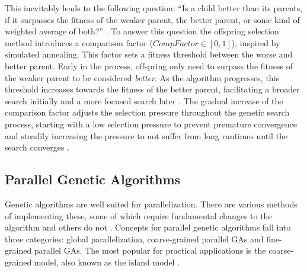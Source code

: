 \documentclass[sigconf]{acmart}
\begin{document}
This inevitably leads to the following question:
\enquote{Is a child better than its parents, if it surpasses the fitness of the
weaker parent, the better parent, or some kind of weighted average of both?}
\cite{Affenzeller2009}.
To answer this question the offspring selection method introduces a comparison
factor ($CompFactor \in [0, 1]$), inspired by simulated annealing. This factor
sets a fitness threshold between the worse and better parent. Early in the
process, offspring only need to surpass the fitness of the weaker parent to
be considered \textit{better}. As the algorithm progresses, this threshold
increases towards the fitness of the better parent, facilitating a broader
search initially and a more focused search later \cite{Affenzeller2009}.
The gradual increase of the comparison factor adjusts the selection pressure
throughout the genetic search process, starting with a low selection pressure
to prevent premature convergence and steadily increasing the pressure to
not suffer from long runtimes until the search converges \cite{Affenzeller2009}.


\subsection{Parallel Genetic Algorithms}
Genetic algorithms are well suited for parallelization. There are various
methods of implementing these, some of which require fundamental changes to the
algorithm and others do not \cite{Affenzeller2009}.
%
Concepts for parallel genetic algorithms fall into three categories:
global parallelization, coarse-grained parallel GAs and fine-grained parallel
GAs. The most popular for practical applications is the coarse-grained model,
also known as the island model \cite{Affenzeller2009}.
\end{document}
